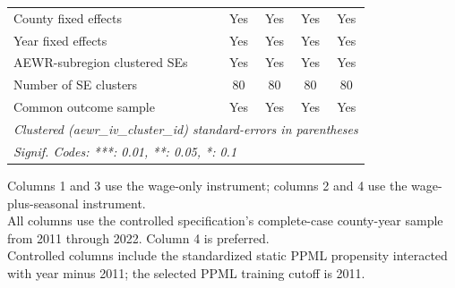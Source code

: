 \begin{table}[htbp]
\begin{tabular}{lcccc}
      County fixed effects                 & Yes              & Yes              & Yes                  & Yes\\  
      Year fixed effects                   & Yes              & Yes              & Yes                  & Yes\\  
      AEWR-subregion clustered SEs         & Yes              & Yes              & Yes                  & Yes\\  
      Number of SE clusters                & 80               & 80               & 80                   & 80\\  
      Common outcome sample                & Yes              & Yes              & Yes                  & Yes\\  
      \midrule \midrule
      \multicolumn{5}{l}{\emph{Clustered (aewr\_iv\_cluster\_id) standard-errors in parentheses}}\\
      \multicolumn{5}{l}{\emph{Signif. Codes: ***: 0.01, **: 0.05, *: 0.1}}\\
   \end{tabular}
   
   \par \raggedright 
   Columns 1 and 3 use the wage-only instrument; columns 2 and 4 use the wage-plus-seasonal instrument.\\
   All columns use the controlled specification's complete-case county-year sample from 2011 through 2022. Column 4 is preferred.\\
   Controlled columns include the standardized static PPML propensity interacted with year minus 2011; the selected PPML training cutoff is 2011.
\end{table}


